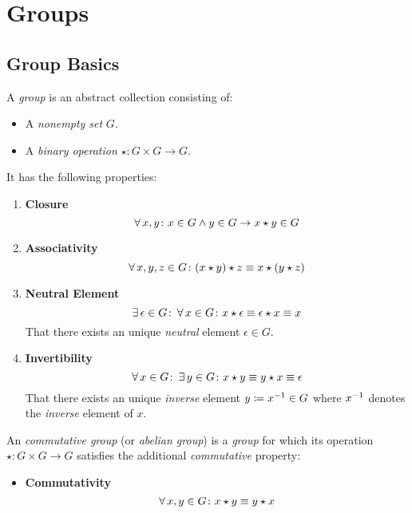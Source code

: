 \chapter{Groups}

\section{Group Basics}

A \textit{group} is an abstract collection consisting of:
\begin{itemize}
    \item A \textit{nonempty set} $G$.
    \item A \textit{binary operation} $\star \colon G \times G \to G$.
\end{itemize}

It has the following properties:
\begin{enumerate}
    \item \textbf{Closure}
    \begin{equation}
        \operatorname{\forall} x, y \colon x \in G \land y \in G \to x \star y \in G
    \end{equation}
    \item \textbf{Associativity}
    \begin{equation}
        \operatorname{\forall} x, y, z \in G \colon (x \star y) \star z \equiv x \star (y \star z)
    \end{equation}
    \item \textbf{Neutral Element}
    \begin{equation}
        \operatorname{\exists} \epsilon \in G \colon \operatorname{\forall} x \in G \colon x \star \epsilon \equiv \epsilon \star x \equiv x
    \end{equation}
    That there exists an unique \textit{neutral} element $\epsilon \in G$.
    \item \textbf{Invertibility}
    \begin{equation}
        \operatorname{\forall} x \in G \colon \operatorname{\exists} y \in G \colon x \star y \equiv y \star x \equiv \epsilon
    \end{equation}
    That there exists an unique \textit{inverse} element $y \coloneqq {x}^{-1} \in G$ where ${x}^{-1}$ denotes the \textit{inverse} element of $x$.
\end{enumerate}

\begin{definition}
    An \textit{commutative group} (or \textit{abelian group}) is a \textit{group} for which its operation $\star \colon G \times G \to G$ satisfies the additional \textit{commutative} property:
    \begin{itemize}
        \item \textbf{Commutativity}
        \begin{equation}
            \operatorname{\forall} x, y \in G \colon x \star y \equiv y \star x
        \end{equation}
    \end{itemize}
\end{definition}


